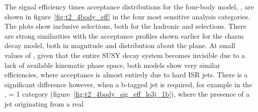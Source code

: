 The signal efficiency times acceptance distributions for the four-body model,
\Ttwodegen, are shown 
in figure~\ref{fig:t2_4body_eff} in the four most sensitive analysis categories.
The plots show inclusive \HT selections, both for the hadronic and \mj
selections. There
are strong similarities with the acceptance profiles shown earlier for the
charm decay model,
both in magnitude and distribution about the plane. At small values of \deltam, 
given that the entire SUSY decay system becomes invisible due to a lack of 
available kinematic phase space, both models show very similar efficiencies,
where
acceptance is almost entirely due to hard ISR jets. There is a
significant difference however, when a b-tagged jet is required, for example in 
the \njlow, \nb= 1 category (figure~\ref{fig:t2_4body_sig_eff_le3j_1b}), where
the presence of a jet originating from a real 
%
